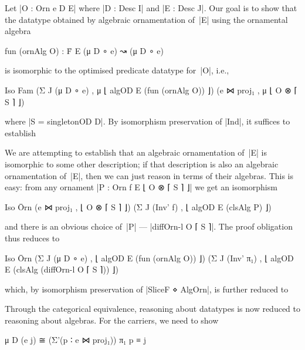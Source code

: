 Let |O : Orn e D E| where |D : Desc I| and |E : Desc J|.
Our goal is to show that the datatype obtained by algebraic ornamentation of~|E| using the ornamental algebra
\begin{code}
fun (ornAlg O) : Ḟ E (μ D ∘ e) ↝ (μ D ∘ e)
\end{code}
is isomorphic to the optimised predicate datatype for~|O|, i.e.,
\begin{code}
Iso Fam  (Σ J (μ D ∘ e)  , μ ⌊ algOD E (fun (ornAlg O)) ⌋)
         (e ⋈ proj₁      , μ ⌊ O ⊗ ⌈ S ⌉ ⌋)
\end{code}
where |S = singletonOD D|.
By isomorphism preservation of |Ind|, it suffices to establish
We are attempting to establish that an algebraic ornamentation of~|E| is isomorphic to some other description; if that description is also an algebraic ornamentation of~|E|, then we can just reason in terms of their algebras.
This is easy: from any ornament |P : Orn f E ⌊ O ⊗ ⌈ S ⌉ ⌋| we get an isomorphism 
\begin{code}
Iso Ōrn  (e ⋈ proj₁     , ⌊ O ⊗ ⌈ S ⌉ ⌋)
         (Σ J (Inv' f)  , ⌊ algOD E (clsAlg P) ⌋)
\end{code}
and there is an obvious choice of~|P| --- |diffOrn-l O ⌈ S ⌉|.
The proof obligation thus reduces to
\begin{code}
Iso Ōrn  (Σ J (μ D ∘ e)  , ⌊ algOD E (fun (ornAlg O)) ⌋)
         (Σ J (Inv' π₁)  , ⌊ algOD E (clsAlg (diffOrn-l O ⌈ S ⌉)) ⌋)
\end{code}
which, by isomorphism preservation of |SliceF ⋄ AlgOrn|, is further reduced to
Through the categorical equivalence, reasoning about datatypes is now reduced to reasoning about algebras.
For the carriers, we need to show
\begin{code}
μ D (e j) ≅ (Σ'(p ∶ e ⋈ proj₁)) π₁ p ≡ j
\end{code}
